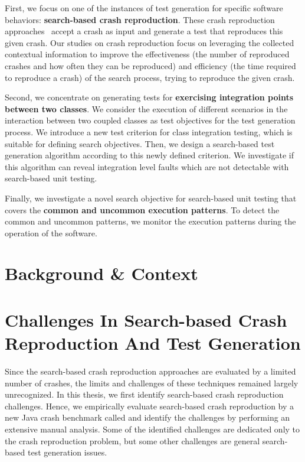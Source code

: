 First, we focus on one of the instances of test generation for specific software behaviors: \textbf{search-based crash reproduction}. These crash reproduction approaches~\cite{Soltani2018a, BPT17concrash, Chen2015, Nayrolles2017, Rossler2013, Xuan2015} accept a crash as input and generate a test that reproduces this given crash. Our studies on crash reproduction focus on leveraging the collected contextual information to improve the effectiveness (\ie the number of reproduced crashes and how often they can be reproduced) and efficiency (\ie the time required to reproduce a crash) of the search process, trying to reproduce the given crash.

Second, we concentrate on generating tests for \textbf{exercising integration points between two classes}. We consider the execution of different scenarios in the interaction between two coupled classes as test objectives for the test generation process. We introduce a new test criterion for class integration testing, which is suitable for defining search objectives. Then, we design a search-based test generation algorithm according to this newly defined criterion. We investigate if this algorithm can reveal integration level faults which are not detectable with search-based unit testing.

Finally, we investigate a novel search objective for search-based unit testing that covers the \textbf{common and uncommon execution patterns}. To detect the common and uncommon patterns, we monitor the execution patterns during the operation of the software.

\section{Background \& Context}


\section{Challenges In Search-based Crash Reproduction And Test Generation}
Since the search-based crash reproduction approaches are evaluated by a limited number of crashes, the limits and challenges of these techniques remained largely unrecognized.
In this thesis, we first identify search-based crash reproduction challenges. Hence, we empirically evaluate search-based crash reproduction by a new Java crash benchmark called \jcrashpack and identify the challenges by performing an extensive manual analysis. Some of the identified challenges are dedicated only to the crash reproduction problem, but some other challenges are general search-based test generation issues.

